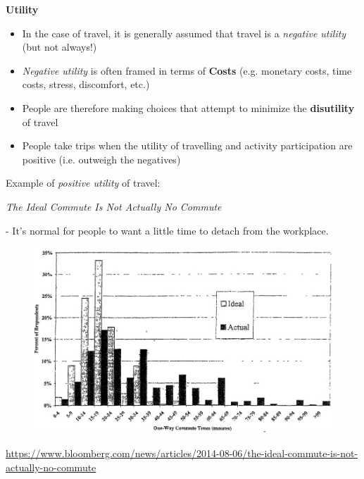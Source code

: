 \documentclass[aspectratio=169]{beamer}
\begin{document}
\begin{frame}
	
	\textbf{Utility}
	\vspace{4mm}
	
	\begin{itemize}
		\item In the case of travel, it is generally assumed that travel is a	\textit{negative utility} (but not always!)
		
		\item \textit{Negative utility} is often framed in terms of \textbf{Costs} (e.g. monetary costs, time costs, stress, discomfort, etc.)
		
		\item People are therefore making choices that attempt to
		minimize the \textbf{disutility} of travel
		
		\item People take trips when the utility of travelling and activity participation are positive (i.e. outweigh the negatives)
	\end{itemize}
	
\end{frame}





\begin{frame}
	
	Example of \textit{positive utility} of travel:
	
	\vspace{3mm}
	
	\textit{The Ideal Commute Is Not Actually No Commute}
	
	- It's normal for people to want a little time to detach from the workplace.
	
	\begin{figure}
		\centering
		\includegraphics[width=0.7\linewidth]{images/commute_ideal.png}
	\end{figure}
	\tiny\url{https://www.bloomberg.com/news/articles/2014-08-06/the-ideal-commute-is-not-actually-no-commute}
	
\end{frame}
\end{document}
